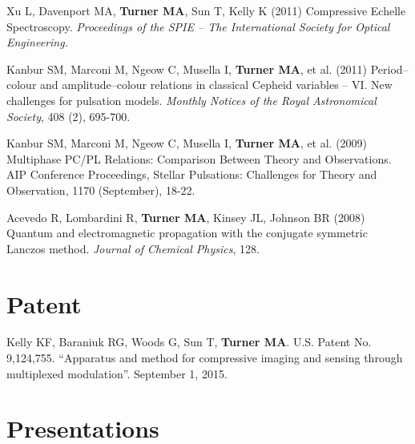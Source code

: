 \documentclass[letterpaper,11pt,oneside]{article}
\begin{document}
\begin{hangparas}{0.25in}{1}
    Xu L, Davenport MA, \textbf{Turner MA}, Sun T, Kelly K (2011) Compressive Echelle Spectroscopy. \emph{Proceedings of the SPIE – The International Society for Optical Engineering.}

    Kanbur SM, Marconi M, Ngeow C, Musella I, \textbf{Turner MA}, et al. (2011) Period–colour and amplitude–colour relations in classical Cepheid variables – VI. New challenges for pulsation models. \emph{Monthly Notices of the Royal Astronomical Society}, 408 (2), 695-700.

    Kanbur SM, Marconi M, Ngeow C, Musella I, \textbf{Turner MA}, et al. (2009) Multiphase PC/PL Relations: Comparison Between Theory and Observations. AIP Conference Proceedings, Stellar Pulsations: Challenges for Theory and Observation, 1170 (September), 18-22.

    Acevedo R, Lombardini R, \textbf{Turner MA}, Kinsey JL, Johnson BR (2008)
    Quantum and electromagnetic propagation with the conjugate symmetric
    Lanczos method. \emph{Journal of Chemical Physics}, 128.
    
  \end{hangparas}

\noindent
\section*{\textcolor{gunmetal}{Patent}}

  \begin{hangparas}{0.25in}{1}
  Kelly KF, Baraniuk RG, Woods G, Sun T, \textbf{Turner MA}. U.S. Patent No. 9,124,755. 
  ``Apparatus and method for compressive imaging and sensing through multiplexed modulation''.
  September 1, 2015.

    
  \end{hangparas}



\noindent

\section*{\textcolor{gunmetal}{Presentations}}
\end{document}
